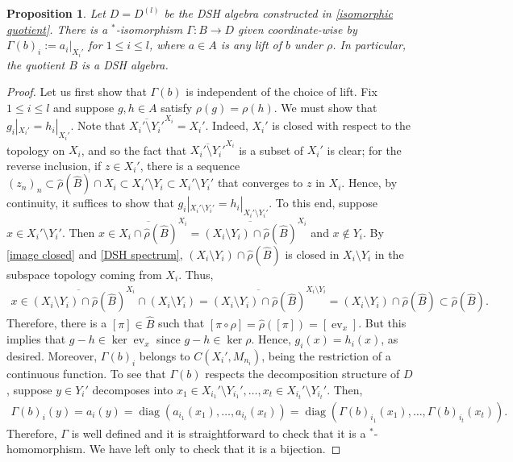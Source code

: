 \documentclass[12pt]{amsart}
\numberwithin{equation}{section}
\newtheorem{proposition}[theorem]{Proposition}
\theoremstyle{definition}
\theoremstyle{remark}
\newcommand{\diag}{\operatorname{diag}}
\newcommand{\ev}{\operatorname{ev}}
\begin{document}
\begin{proposition}
	\label{quotient DSH}
	Let $D=D^{( l)}$ be the DSH algebra constructed in \autoref{isomorphic quotient}. There is a $^*$-isomorphism $\Gamma\colon B\to D$ given coordinate-wise by $\Gamma(b)_{i}:=a_{i}|_{X_{i}'}$ for $1\leq i\leq  l$, where $a\in A$ is any lift of $b$ under $\rho$. In particular, the quotient $B$ is a DSH algebra.
\end{proposition}

\begin{proof}
	Let us first show that $\Gamma(b)$ is independent of the choice of lift. Fix $1\leq i\leq  l$ and suppose $g,h\in A$ satisfy $\rho(g)=\rho(h)$. We must show that $g_{i}|_{X_{i}'}=h_{i}|_{X_{i}'}$. Note that $\overline{X_{i}'\setminus Y_{i}'}^{X_{i}}=X_{i}'$. Indeed, $X_{i}'$ is closed with respect to the topology on $X_{i}$, and so the fact that $\overline{X_{i}'\setminus Y_{i}'}^{X_{i}}$ is a subset of $X_{i}'$ is clear; for the reverse inclusion, if $z\in X_{i}'$, there is a sequence $(z_{n})_{n}\subset \hat{\rho}(\hat{B})\cap X_{i}\subset X_{i}'\setminus Y_{i}\subset X_{i}'\setminus Y_{i}'$ that converges to $z$ in $X_{i}$. Hence, by continuity, it suffices to show that $g_{i}|_{X_{i}'\setminus Y_{i}'}=h_{i}|_{X_{i}'\setminus Y_{i}'}$. To this end, suppose $x\in X_{i}'\setminus Y_{i}'$. Then $x\in \overline{X_{i}\cap\hat{\rho}(\hat{B})}^{X_{i}}=\overline{(X_{i}\setminus Y_{i})\cap\hat{\rho}(\hat{B})}^{X_{i}}$ and $x\notin Y_{i}$. By \autoref{image closed} and \autoref{DSH spectrum}, $(X_{i}\setminus Y_{i})\cap \hat{\rho}(\hat{B})$ is closed in $X_{i}\setminus Y_{i}$ in the subspace topology coming from $X_{i}$. Thus,
	$$
	\begin{aligned}
	x\in \overline{(X_{i}\setminus Y_{i})\cap\hat{\rho}(\hat{B})}^{X_{i}}\cap (X_{i}\setminus Y_{i})
	=\overline{(X_{i}\setminus Y_{i})\cap\hat{\rho}(\hat{B})}^{X_{i}\setminus Y_{i}}
	=(X_{i}\setminus Y_{i})\cap\hat{\rho}(\hat{B})\subset\hat{\rho}(\hat{B}).
	\end{aligned}
	$$
	Therefore, there is a $[\pi]\in \hat{B}$ such that $[\pi\circ\rho]=\hat{\rho}([\pi])=[\ev_{x}]$. But this implies that $g-h\in\ker \ev_{x}$ since $g-h\in \ker\rho$. Hence, $g_{i}(x)=h_{i}(x)$, as desired. Moreover, $\Gamma(b)_{i}$ belongs to $C(X_{i}',M_{n_{i}})$, being the restriction of a continuous function. To see that $\Gamma(b)$ respects the decomposition structure of $D$, suppose  $y\in Y_{i}'$ decomposes into $x_{1}\in X_{i_{1}}'\setminus Y_{i_{1}}', \ldots, x_{t}\in X_{i_{t}}'\setminus Y_{i_{t}}'$. Then,
	$$
	\begin{aligned}
	\Gamma(b)_{i}(y)=a_{i}(y)
	=\diag(a_{i_{1}}(x_{1}),\ldots, a_{i_{t}}(x_{t}))
	=\diag(\Gamma(b)_{i_{1}}(x_{1}),\ldots,\Gamma(b)_{i_{t}}(x_{t})).
	\end{aligned}
	$$ 
	Therefore, $\Gamma$ is well defined and it is straightforward to check that it is a $^*$-homomorphism. We have left only to check that it is a bijection. 
	

\end{proof}
\end{document}
